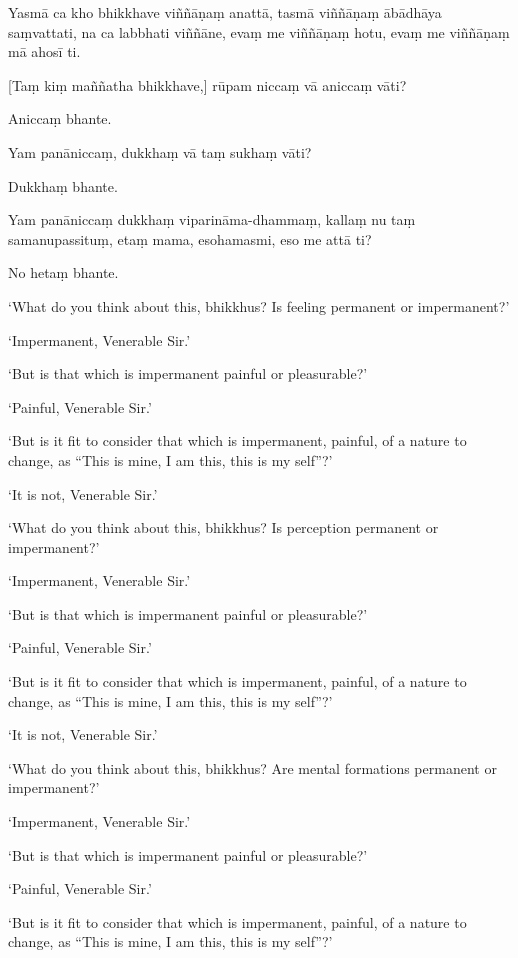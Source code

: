 Yasmā ca kho bhikkhave viññāṇaṃ anattā, tasmā viññāṇaṃ ābādhāya
saṃvattati, na ca labbhati viññāne, evaṃ me viññāṇaṃ hotu, evaṃ me
viññāṇaṃ mā ahosī ti.


[Taṃ kiṃ maññatha bhikkhave,] rūpam niccaṃ vā aniccaṃ vāti?

Aniccaṃ bhante.

Yam panāniccaṃ, dukkhaṃ vā taṃ sukhaṃ vāti?

Dukkhaṃ bhante.

Yam panāniccaṃ dukkhaṃ viparināma-dhammaṃ, kallaṃ nu taṃ samanupassituṃ,
etaṃ mama, esohamasmi, eso me attā ti?

No hetaṃ bhante.

\clearpage

\englishText
\markboth{\englishTitle}{\rightmark}

‘What do you think about this, bhikkhus? Is feeling permanent or
impermanent?’

‘Impermanent, Venerable Sir.’

‘But is that which is impermanent painful or pleasurable?’

‘Painful, Venerable Sir.’

‘But is it fit to consider that which is impermanent, painful, of a
nature to change, as “This is mine, I am this, this is my self”?’

‘It is not, Venerable Sir.’

‘What do you think about this, bhikkhus? Is perception permanent or
impermanent?’

‘Impermanent, Venerable Sir.’

‘But is that which is impermanent painful or pleasurable?’

‘Painful, Venerable Sir.’

‘But is it fit to consider that which is impermanent, painful, of a
nature to change, as “This is mine, I am this, this is my self”?’

‘It is not, Venerable Sir.’

‘What do you think about this, bhikkhus? Are mental formations
permanent or impermanent?’

‘Impermanent, Venerable Sir.’

‘But is that which is impermanent painful or pleasurable?’

‘Painful, Venerable Sir.’

‘But is it fit to consider that which is impermanent, painful, of a
nature to change, as “This is mine, I am this, this is my self”?’

